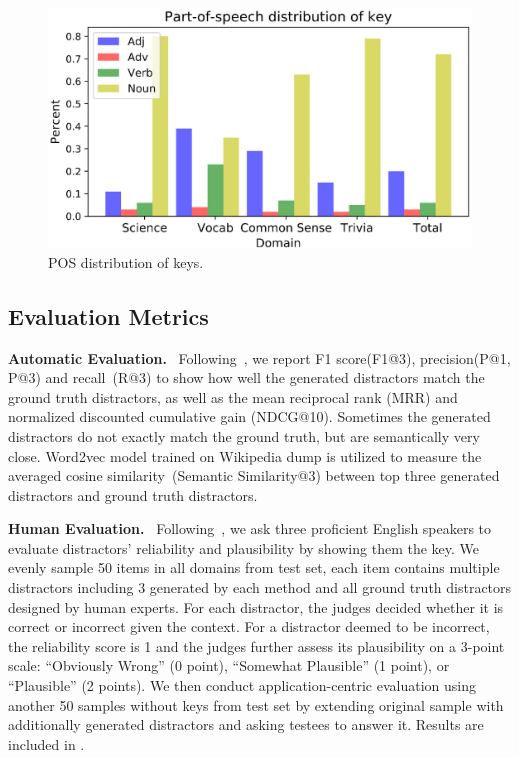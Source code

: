 \begin{figure}[ht!]
	 	\centering
 		\includegraphics[width=1.0\columnwidth]{figure/dist.eps}
 		\caption{POS distribution of keys.}
 		\label{fig:pos}
\end{figure}
\subsection{Evaluation Metrics}
\label{sec:metrics}
\textbf{Automatic Evaluation.} ~Following~\cite{liang2018distractor}, we report F1 score(F1@3), 
precision(P@1, P@3) and recall~(R@3) to show how well the generated distractors 
match the ground truth distractors, 
as well as the mean reciprocal rank (MRR) and normalized discounted 
cumulative gain (NDCG@10). Sometimes the generated distractors
do not exactly match the ground truth, but are semantically very close. 
Word2vec model trained on Wikipedia dump 
is utilized to measure the averaged cosine similarity~(Semantic Similarity@3) between top three generated 
distractors and ground truth distractors.  

\noindent
\textbf{Human Evaluation.} ~Following~\cite{jiang2017distractor}, we ask three proficient English speakers to evaluate distractors' reliability and plausibility by showing them the key. We evenly sample 50 items in all domains from test set, each item contains multiple distractors including 3 generated by each method and all ground truth distractors 
designed by human experts. For each distractor, the judges decided whether 
it is correct or incorrect given the context. For a distractor deemed to 
be incorrect, the reliability score is 1 and the judges further assess 
its plausibility on a 3-point scale: 
``Obviously Wrong'' (0 point), 
``Somewhat Plausible'' (1 point), 
or ``Plausible'' (2 points). We then conduct application-centric evaluation using another 50 samples without keys from test set by extending original sample with additionally generated distractors and asking testees to answer it. Results are included in .


